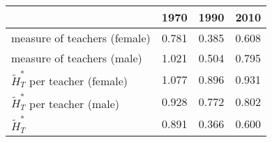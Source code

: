 \begin{table}
  \centering \begin{tabular}{lccc}
\toprule
& 1970 & 1990 & 2010 \\
\midrule
measure of teachers (female) & 0.781 & 0.385 &0.608\\
measure of teachers (male) & 1.021 & 0.504 & 0.795\\
$\widetilde{H}_T^*$ per teacher (female)   & 1.077 & 0.896 & 0.931 \\
$\widetilde{H}_T^*$ per teacher (male)   & 0.928 & 0.772 & 0.802 \\
$\widetilde{H}_T^*$ & 0.891  & 0.366 & 0.600 \\
\bottomrule
\end{tabular}
  \label{ }
\end{table}